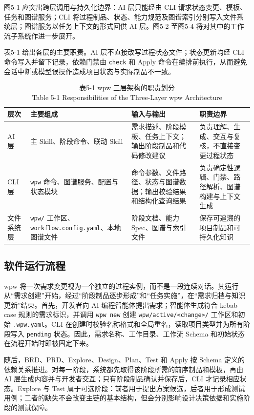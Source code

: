 图5-1 应突出跨层调用与持久化边界：AI 层只能经由 CLI 请求状态变更、模板、任务和图谱服务；CLI 将过程制品、状态、能力规范及图谱索引分别写入文件系统层；图谱服务以任务上下文的形式回供 AI 层。图5-2 至图5-4 将对其中的工作流子系统作进一步展开。

表5-1 给出各层的主要职责。AI 层不直接改写过程状态文件；状态更新均经 CLI 命令写入并留下记录，依赖门禁由 \texttt{check} 和 Apply 命令在编排前执行，从而避免会话中断或模型误操作造成项目状态与实际制品不一致。

\begin{table}[htbp]
\centering
\small
\caption{表5-1 wpw 三层架构的职责划分\\Table 5-1 Responsibilities of the Three-Layer wpw Architecture}
\begin{tabularx}{\textwidth}{|X|X|X|X|}
\hline
\textbf{层次} & \textbf{主要组成} & \textbf{输入与输出} & \textbf{职责边界} \\
\hline
AI 层 & 主 Skill、阶段命令、联动 Skill & 需求描述、阶段模板、任务上下文；输出阶段制品和代码修改建议 & 负责理解、生成、交互与复核，不直接变更过程状态 \\
CLI 层 & \texttt{wpw} 命令、图谱服务、配置与状态模块 & 命令参数、文件路径、状态与图谱数据；输出校验结果和结构化查询结果 & 负责确定性逻辑、门禁、路径解析、图谱构建与上下文生成 \\
文件系统层 & \texttt{wpw/} 工作区、\texttt{workflow.config.yaml}、本地图谱文件 & 阶段文档、能力 Spec、图谱与索引文件 & 保存可追溯的项目制品和可持久化知识 \\
\hline
\end{tabularx}
\end{table}


\subsection{软件运行流程}
wpw 将一次需求变更视为一个独立的过程实例，而不是一段连续对话。其运行从“需求创建”开始，经过“阶段制品逐步形成”和“任务实施”，在“需求归档与知识更新”结束。首先，开发者向 AI 编程智能体提出需求；智能体生成符合 kebab-case 规则的需求标识，并调用 \texttt{wpw new} 创建 \texttt{wpw/active/<change>/} 工作区和初始 \texttt{.wpw.yaml}。CLI 在创建时校验名称格式和全局重名，读取项目类型并为所有阶段写入 \texttt{pending} 状态。因此，需求名称、工作目录、工作流 Schema 和初始状态在流程开始时即被固定下来。

随后，BRD、PRD、Explore、Design、Plan、Test 和 Apply 按 Schema 定义的依赖关系推进。对每一阶段，系统都先取得该阶段所需的前序制品和模板，再由 AI 层生成内容并与开发者交互；只有阶段制品确认并保存后，CLI 才记录相应状态。Explore 与 Test 属于可选阶段：前者用于提出方案候选，后者用于形成测试用例；二者的缺失不会改变主链的基本结构，但会分别影响设计决策依据和实施阶段的测试保障。

